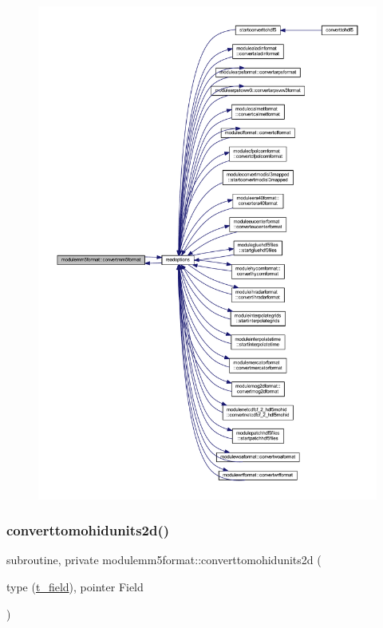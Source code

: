 \begin{figure}[H]
\begin{center}
\leavevmode
\includegraphics[width=350pt]{namespacemodulemm5format_a1a626b0d9d1e86eb446e37da6e498536_icgraph}
\end{center}
\end{figure}
\mbox{\label{namespacemodulemm5format_a971d0306a569327363e6c98d9e1dd0c7}} 
\subsubsection{\texorpdfstring{converttomohidunits2d()}{converttomohidunits2d()}}
{\footnotesize\ttfamily subroutine, private modulemm5format\+::converttomohidunits2d (\begin{DoxyParamCaption}\item[{type (\mbox{\hyperlink{structmodulemm5format_1_1t__field}{t\+\_\+field}}), pointer}]{Field }\end{DoxyParamCaption})\hspace{0.3cm}{\ttfamily [private]}}

